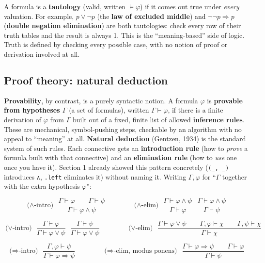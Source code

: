 A formula is a \textbf{tautology} (valid, written \(\models \varphi\)) if it comes out true under \emph{every} valuation. For example, \(p \vee \neg p\) (the \textbf{law of excluded middle}) and \(\neg\neg p \Rightarrow p\) (\textbf{double negation elimination}) are both tautologies: check every row of their truth tables and the result is always 1. This is the ``meaning-based'' side of logic. Truth is defined by checking every possible case, with no notion of proof or derivation involved at all.

\subsection{Proof theory: natural deduction}\label{sec:03-propositions-and-proofs:02-logic-recap:5}

\textbf{Provability}, by contrast, is a purely syntactic notion. A formula \(\varphi\) is \textbf{provable from hypotheses \(\Gamma\)} (a set of formulas), written \(\Gamma \vdash \varphi\), if there is a finite derivation of \(\varphi\) from \(\Gamma\) built out of a fixed, finite list of allowed \textbf{inference rules}. These are mechanical, symbol-pushing steps, checkable by an algorithm with no appeal to ``meaning'' at all. \textbf{Natural deduction} (Gentzen, 1934) is the standard system of such rules. Each connective gets an \textbf{introduction rule} (how to \emph{prove} a formula built with that connective) and an \textbf{elimination rule} (how to \emph{use} one once you have it). Section 1 already showed this pattern concretely (\texttt{⟨\_\allowbreak{}, \_\allowbreak{}⟩} introduces \texttt{∧}, \texttt{.left} eliminates it) without naming it. Writing \(\Gamma, \varphi\) for ``\(\Gamma\) together with the extra hypothesis \(\varphi\)'':

\[
\text{($\wedge$-intro)}\ \ \frac{\Gamma \vdash \varphi \qquad \Gamma \vdash \psi}
{\Gamma \vdash \varphi \wedge \psi}
\qquad\qquad
\text{($\wedge$-elim)}\ \ \frac{\Gamma \vdash \varphi \wedge \psi}{\Gamma \vdash \varphi}
\ \ \ \frac{\Gamma \vdash \varphi \wedge \psi}{\Gamma \vdash \psi}
\]

\[
\text{($\vee$-intro)}\ \ \frac{\Gamma \vdash \varphi}{\Gamma \vdash \varphi \vee \psi}
\ \ \ \frac{\Gamma \vdash \psi}{\Gamma \vdash \varphi \vee \psi}
\qquad\qquad
\text{($\vee$-elim)}\ \ \frac{\Gamma \vdash \varphi \vee \psi \qquad \Gamma, \varphi \vdash \chi \qquad \Gamma, \psi \vdash \chi}{\Gamma \vdash \chi}
\]

\[
\text{($\Rightarrow$-intro)}\ \ \frac{\Gamma, \varphi \vdash \psi}{\Gamma \vdash \varphi \Rightarrow \psi}
\qquad\qquad
\text{($\Rightarrow$-elim, modus ponens)}\ \ \frac{\Gamma \vdash \varphi \Rightarrow \psi \qquad \Gamma \vdash \varphi}{\Gamma \vdash \psi}
\]

